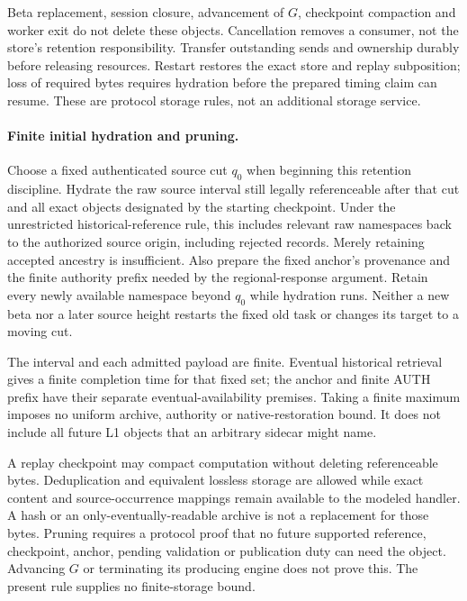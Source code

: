 Beta replacement, session closure, advancement of $G$, checkpoint
compaction and worker exit do not delete these objects. Cancellation
removes a consumer, not the store's retention responsibility. Transfer
outstanding sends and ownership durably before releasing resources.
Restart restores the exact store and replay subposition; loss of required
bytes requires hydration before the prepared timing claim can resume.
These are protocol storage rules, not an additional storage service.

\paragraph{Finite initial hydration and pruning.}
\label{sec:source-hydration}
Choose a fixed authenticated source cut $q_0$ when beginning this
retention discipline. Hydrate the raw source interval still legally
referenceable after that cut and all exact objects designated by the
starting checkpoint. Under the unrestricted historical-reference rule,
this includes relevant raw namespaces back to the authorized source
origin, including rejected records. Merely retaining accepted ancestry
is insufficient. Also prepare the fixed anchor's provenance and the
finite authority prefix needed by the regional-response argument.
Retain every newly available namespace beyond $q_0$ while hydration
runs. Neither a new beta nor a later source height restarts the fixed
old task or changes its target to a moving cut.

The interval and each admitted payload are finite. Eventual historical
retrieval gives a finite completion time for that fixed set; the anchor
and finite AUTH prefix have their separate eventual-availability
premises. Taking a finite maximum imposes no uniform archive,
authority or native-restoration bound. It does not include all future
L1 objects that an arbitrary sidecar might name.

A replay checkpoint may compact computation without deleting
referenceable bytes. Deduplication and equivalent lossless storage are
allowed while exact content and source-occurrence mappings remain
available to the modeled handler. A hash or an only-eventually-readable
archive is not a replacement for those bytes. Pruning requires a
protocol proof that no future supported reference, checkpoint,
anchor, pending validation or publication duty can need the object.
Advancing $G$ or terminating its producing engine does not prove this.
The present rule supplies no finite-storage bound.


